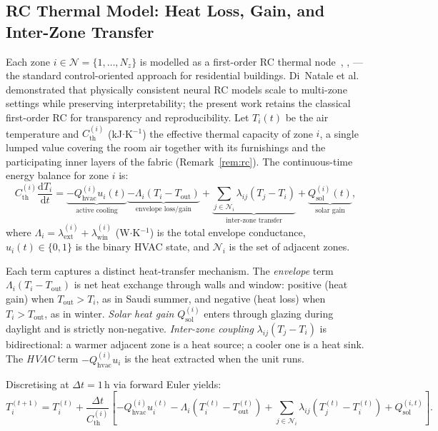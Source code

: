 \documentclass[3p,number]{elsarticle}
\let\oldsubsection\subsection
\renewcommand{\subsection}{\FloatBarrier\oldsubsection}
\newcommand{\Tout}{T_{\mathrm{out}}}
\newcommand{\Cth}{C_{\mathrm{th}}}
\newcommand{\lext}{\lambda_{\mathrm{ext}}}
\newcommand{\lwin}{\lambda_{\mathrm{win}}}
\newcommand{\lij}{\lambda_{ij}}
\newcommand{\Qhvac}{Q_{\mathrm{hvac}}}
\begin{document}
\subsection{RC Thermal Model: Heat Loss, Gain, and Inter-Zone Transfer}
\label{subsec:thermal}
 
Each zone $i\in\mathcal{N}=\{1,\ldots,N_z\}$ is modelled as a first-order RC thermal node~\cite{Drgoona2021}, \cite{Wang2021RC}, \cite{Deng2022}---the standard control-oriented approach for residential buildings.
Di~Natale et al.~\cite{DiNatale2023} demonstrated that physically consistent neural RC models scale to multi-zone settings while preserving interpretability; the present work retains the classical first-order RC for transparency and reproducibility.
Let $T_i(t)$ be the air temperature and $\Cth^{(i)}$ (kJ$\cdot$K$^{-1}$) the effective thermal capacity of zone $i$, a single lumped value covering the room air together with its furnishings and the participating inner layers of the fabric (Remark~\ref{rem:rc}).
The continuous-time energy balance for zone $i$ is:
\begin{equation}
  \Cth^{(i)}\frac{\mathrm{d}T_i}{\mathrm{d}t}
  =
  \underbrace{-\Qhvac^{(i)}u_i(t)}_{\text{active cooling}}
  \underbrace{-\Lambda_i\!\left(T_i-\Tout\right)}_{\text{envelope loss/gain}}
  +\underbrace{\sum_{j\in\mathcal{N}_i}\lij\!\left(T_j-T_i\right)}_{\text{inter-zone transfer}}
  +\underbrace{Q_{\mathrm{sol}}^{(i)}(t)}_{\text{solar gain}},
  \label{eq:rc_cont}
\end{equation}
where $\Lambda_i=\lext^{(i)}+\lwin^{(i)}$ (W$\cdot$K$^{-1}$) is the total envelope conductance, $u_i(t)\in\{0,1\}$ is the binary HVAC state, and $\mathcal{N}_i$ is the set of adjacent zones.
 
Each term captures a distinct heat-transfer mechanism.
The \emph{envelope} term $\Lambda_i(T_i-\Tout)$ is net heat exchange through walls and window: positive (heat gain) when $\Tout>T_i$, as in Saudi summer, and negative (heat loss) when $T_i>\Tout$, as in winter.
\emph{Solar heat gain} $Q_{\mathrm{sol}}^{(i)}$ enters through glazing during daylight and is strictly non-negative.
\emph{Inter-zone coupling} $\lij(T_j-T_i)$ is bidirectional: a warmer adjacent zone is a heat source; a cooler one is a heat sink.
The \emph{HVAC} term $-\Qhvac^{(i)}u_i$ is the heat extracted when the unit runs.
 
Discretising at $\Delta t=1\,\text{h}$ via forward Euler yields:
\begin{equation}
  T_i^{(t+1)}=T_i^{(t)}
  +\frac{\Delta t}{\Cth^{(i)}}
  \!\left[
    -\Qhvac^{(i)}u_i^{(t)}
    -\Lambda_i\!\left(T_i^{(t)}-\Tout^{(t)}\right)
    +\sum_{j\in\mathcal{N}_i}\lij\!\left(T_j^{(t)}-T_i^{(t)}\right)
    +Q_{\mathrm{sol}}^{(i,t)}
  \right].
  \label{eq:rc_disc}
\end{equation}
\end{document}
